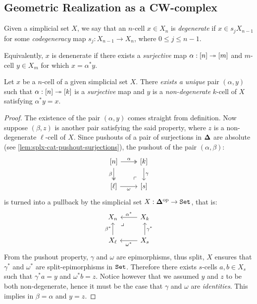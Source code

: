 \subsection{Geometric Realization as a CW-complex}

\begin{definition}
    \label{def:degenerate-n-cell}
    Given a simplicial set \(X\), we say that an \(n\)-cell \(x \in X_n\) is
    \emph{degenerate} if \(x \in s_j X_{n-1}\) for some \emph{codegeneracy} map
    \(s_j: X_{n-1} \to X_n\), where \(0 \leq j \leq n-1\).

    Equivalently, \(x\) is denenerate if there exists a \emph{surjective} map
    \(\alpha: [n] \twoheadrightarrow [m]\) and \(m\)-cell \(y \in X_m\) for which
    \(x = \alpha^{*} y\).
\end{definition}

\begin{lemma}
    \label{lem:Eilenberg-Zilber}
    Let \(x\) be a \(n\)-cell of a given simplicial set \(X\). There \emph{exists
        a unique} pair \((\alpha, y)\) such that \(\alpha: [n] \twoheadrightarrow [k]\) is a
    \emph{surjective} map and \(y\) is a \emph{non-degenerate} \(k\)-cell of
    \(X\) satisfying \(\alpha^{*} y = x\).
\end{lemma}

\begin{proof}
    The existence of the pair \((\alpha, y)\) comes straight from definition. Now
    suppose \((\beta, z)\) is another pair satisfying the said property, where \(z\)
    is a non-degenerate \(\ell\)-cell of \(X\). Since pushouts of a pair of
    surjections in \({\mathbf{\Delta}}\) are absolute (see
    \cref{lem:splx-cat-pushout-surjections}), the pushout of the pair
    \((\alpha, \beta)\):
    \[
        \begin{tikzcd}
            {[n]} \ar[r, two heads, "\alpha"]
            \ar[d, two heads, "\beta"']
            \ar[dr, phantom, "\ulcorner", very near end]
            &{[k]} \ar[d, "\gamma"] \\
            {[\ell]} \ar[r, "\omega"'] &{[s]}
        \end{tikzcd}
    \]
    is turned into a pullback by the simplicial set \(X: {\mathbf{\Delta}}^{\mathrm{op}} \to {\texttt{Set}}\),
    that is:
    \[
        \begin{tikzcd}
            X_n \ar[rd, phantom, very near start, "\lrcorner"]
            &X_k \ar[l, "\alpha^{*}"']
            \\
            X_{\ell} \ar[u, "\beta^{*}"]
            &X_s \ar[u, "\gamma^{*}"'] \ar[l, "\omega^{*}"]
        \end{tikzcd}
    \]
    From the pushout property, \(\gamma\) and \(\omega\) are epimorphisms, thus
    split, \(X\) ensures that \(\gamma^{*}\) and \(\omega^{*}\) are
    split-epimorphisms in \({\texttt{Set}}\). Therefore there exists \(s\)-cells
    \(a, b \in X_s\) such that \(\gamma^{*} a = y\) and \(\omega^{*} b = z\). Notice
    however that we assumed \(y\) and \(z\) to be both non-degenerate, hence it must
    be the case that \(\gamma\) and \(\omega\) are \emph{identities}. This implies
    in \(\beta = \alpha\) and \(y = z\).
\end{proof}

